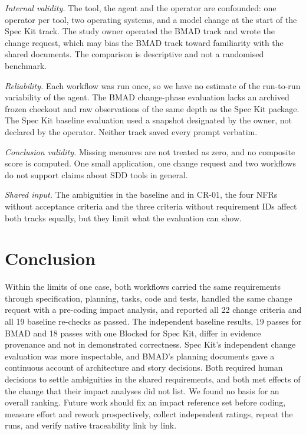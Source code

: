 \documentclass[conference]{IEEEtran}
\begin{document}
\emph{Internal validity.} The tool, the agent and the operator are
confounded: one operator per tool, two operating systems, and a model
change at the start of the Spec Kit track. The study owner operated the
BMAD track and wrote the change request, which may bias the BMAD track
toward familiarity with the shared documents. The comparison is
descriptive and not a randomised benchmark.

\emph{Reliability.} Each workflow was run once, so we have no estimate
of the run-to-run variability of the agent. The BMAD change-phase
evaluation lacks an archived frozen checkout and raw observations of the
same depth as the Spec Kit package. The Spec Kit baseline evaluation
used a snapshot designated by the owner, not declared by the operator.
Neither track saved every prompt verbatim.

\emph{Conclusion validity.} Missing measures are not treated as zero,
and no composite score is computed. One small application, one change
request and two workflows do not support claims about SDD tools in
general.

\emph{Shared input.} The ambiguities in the baseline and in CR-01, the
four NFRs without acceptance criteria and the three criteria without
requirement IDs affect both tracks equally, but they limit what the
evaluation can show.

\section{Conclusion}\label{conclusion}

Within the limits of one case, both workflows carried the same
requirements through specification, planning, tasks, code and tests,
handled the same change request with a pre-coding impact analysis, and
reported all 22 change criteria and all 19 baseline re-checks as passed.
The independent baseline results, 19 passes for BMAD and 18 passes with
one Blocked for Spec Kit, differ in evidence provenance and not in
demonstrated correctness. Spec Kit's independent change evaluation was
more inspectable, and BMAD's planning documents gave a continuous
account of architecture and story decisions. Both required human
decisions to settle ambiguities in the shared requirements, and both met
effects of the change that their impact analyses did not list. We found
no basis for an overall ranking. Future work should fix an impact
reference set before coding, measure effort and rework prospectively,
collect independent ratings, repeat the runs, and verify native
traceability link by link.
\end{document}
